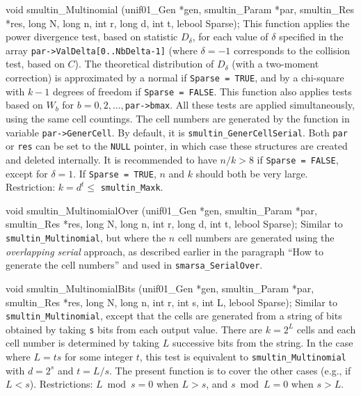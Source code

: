 

\code

void smultin_Multinomial (unif01_Gen *gen, smultin_Param *par,
   smultin_Res *res, long N, long n, int r, long d, int t, lebool Sparse);
\endcode
 \tab
  This function applies the power divergence
  test, based on
  statistic $D_\delta$, for each value of $\delta$ specified in the array
  {\tt par->ValDelta[0..NbDelta-1]} (where $\delta = -1$
  corresponds to the collision test, based on $C$).
  The theoretical distribution of $D_\delta$ (with a two-moment correction)
  is approximated by a normal if {\tt Sparse = TRUE}, and by a chi-square
  with $k-1$ degrees of freedom if {\tt Sparse = FALSE}.
  This function also applies tests based on $W_b$ for 
  $b=0, 2,\dots, ${\tt par->bmax}.
  All these tests are applied simultaneously, using the same cell
  countings. The cell numbers are generated by the function in variable 
  {\tt par->GenerCell}.
  By default, it is {\tt smultin\_GenerCellSerial}. 
  Both {\tt par} or {\tt res} can be set to the {\tt NULL} pointer, in
  which case these structures are created and deleted internally.
  It is recommended to have $n/k > 8$ if {\tt Sparse = FALSE},
  except for $\delta=1$.  
  If {\tt Sparse = TRUE}, $n$ and $k$ should both  be very large.  
  Restriction: $k = d^t \le ${ \tt smultin\_Maxk}.
 \endtab
\code


void smultin_MultinomialOver (unif01_Gen *gen, smultin_Param *par,
   smultin_Res *res, long N, long n, int r, long d, int t, lebool Sparse);
\endcode
 \tab
  Similar to {\tt smultin\_Multinomial}, but where the $n$ cell
  numbers are generated using the {\em overlapping serial\/} approach,
  as described earlier in the paragraph ``How to generate the cell numbers''
  and used in  {\tt smarsa\_SerialOver}.
 \endtab
\code


void smultin_MultinomialBits (unif01_Gen *gen, smultin_Param *par,
   smultin_Res *res, long N, long n, int r, int s, int L, lebool Sparse);
\endcode
 \tab
  Similar to {\tt smultin\_Multinomial}, except that the cells are generated
  from a string of bits obtained by taking {\tt s} bits from each 
  output value.  There are $k = 2^L$ cells
  and each cell number is determined by taking $L$ successive bits from
  the string.
  In the case where $L = ts$ for some integer $t$, this test is
  equivalent to {\tt smultin\_Multinomial} with $d = 2^s$ and $t = L/s$.
  The present function is to cover the other cases (e.g., if $L < s$).
  Restrictions:  $L \bmod s = 0$ when $L > s$, and 
   $s \bmod L = 0$ when $s > L$.
 \endtab
\code


